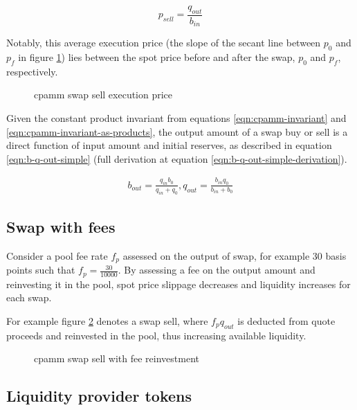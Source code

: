 \documentclass[table, twocolumn]{article}
\begin{document}
\begin{equation} \label{eqn:cpamm-avg-execution-price}
  p_{sell} = \frac{q_{out}}{b_{in}}
\end{equation}

Notably, this average execution price (the slope of the secant line between $p_0$ and $p_f$ in
figure \ref{fig:cpamm-swap-sell-price}) lies between the spot price before and after the swap, $p_0$
and $p_f$, respectively.

\begin{figure}[!htb]
  \centering
  
  \caption{\gls{cpamm} swap sell execution price}
  \label{fig:cpamm-swap-sell-price}
\end{figure}

Given the constant product invariant from equations \ref{eqn:cpamm-invariant} and
\ref{eqn:cpamm-invariant-as-products}, the output amount of a swap buy or sell is a direct function
of input amount and initial reserves, as described in equation \ref{eqn:b-q-out-simple} (full
derivation at equation \ref{eqn:b-q-out-simple-derivation}).

\begin{align} \label{eqn:b-q-out-simple}
  b_{out} = \frac{q_{in} b_0}{q_{in} + q_0}, q_{out} = \frac{b_{in} q_0}{b_{in} + b_0}
\end{align}

\subsection{Swap with fees}

Consider a pool fee rate $f_p$ assessed on the output of swap, for example 30 basis points such that
$f_p = \frac{30}{10000}$. By assessing a fee on the output amount and reinvesting it in the pool,
spot price slippage decreases and liquidity increases for each swap.

For example figure \ref{fig:cpamm-swap-sell-with-fee} denotes a swap sell, where $f_p q_{out}$ is
deducted from quote proceeds and reinvested in the pool, thus increasing available liquidity.

\begin{figure}[!htb]
  \centering
  
  \caption{\gls{cpamm} swap sell with fee reinvestment}
  \label{fig:cpamm-swap-sell-with-fee}
\end{figure}

\subsection{Liquidity provider tokens}
\end{document}
